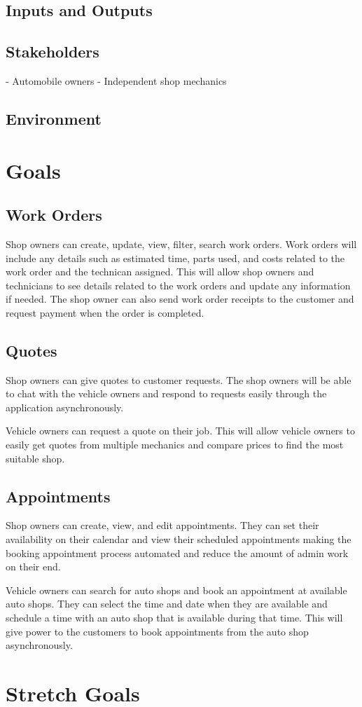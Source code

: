 \documentclass{article}
\begin{document}
\subsection{Inputs and Outputs}


\subsection{Stakeholders}
- Automobile owners
- Independent shop mechanics

\subsection{Environment}


\section{Goals}
\subsection{Work Orders}
\item Shop owners can create, update, view, filter, search work orders. Work orders will include any details such as estimated time, parts used, and costs related to the work order and the technican assigned. This will allow shop owners and technicians to see details related to the work orders and update any information if needed. The shop owner can also send work order receipts to the customer and request payment when the order is completed.
\subsection{Quotes}
\item Shop owners can give quotes to customer requests. The shop owners will be able to chat with the vehicle owners and respond to requests easily through the application asynchronously.
\item Vehicle owners can request a quote on their job. This will allow vehicle owners to easily get quotes from multiple mechanics and compare prices to find the most suitable shop.
\subsection{Appointments}
\item Shop owners can create, view, and edit appointments. They can set their availability on their calendar and view their scheduled appointments making the booking appointment process automated and reduce the amount of admin work on their end.
\item Vehicle owners can search for auto shops and book an appointment at available auto shops. They can select the time and date when they are available and schedule a time with an auto shop that is available during that time. This will give power to the customers to book appointments from the auto shop asynchronously.

\section{Stretch Goals}
\end{document}
